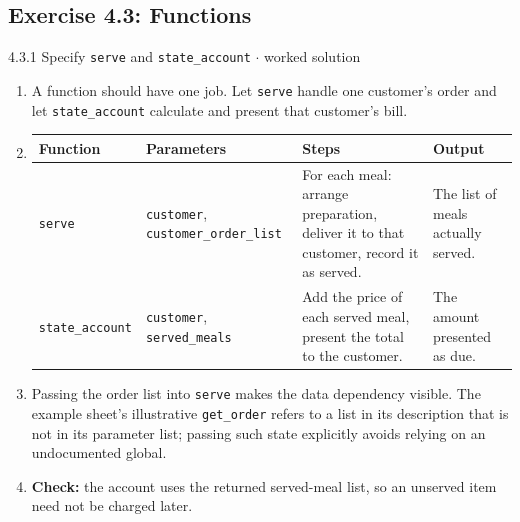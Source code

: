 \documentclass[11pt]{article}
\begin{document}
\begin{keepsection}\subsection{Exercise 4.3: Functions}

\begin{workedbox}{4.3.1 Specify \texttt{serve} and \texttt{state\_account} \ensuremath{\cdot} worked solution}
\begin{enumerate}
\item A function should have one job. Let \texttt{serve} handle one customer's order and let \texttt{state\_account} calculate and present that customer's bill.
\item {}
\begin{center}\small\begin{tabularx}{\linewidth}{>{\raggedright\arraybackslash}X>{\raggedright\arraybackslash}X>{\raggedright\arraybackslash}X>{\raggedright\arraybackslash}X}\toprule
\textbf{Function} & \textbf{Parameters} & \textbf{Steps} & \textbf{Output} \\ \midrule
\texttt{serve} & \texttt{customer}, \texttt{customer\_order\_list} & For each meal: arrange preparation, deliver it to that customer, record it as served. & The list of meals actually served. \\
\texttt{state\_account} & \texttt{customer}, \texttt{served\_meals} & Add the price of each served meal, present the total to the customer. & The amount presented as due. \\
\bottomrule\end{tabularx}\end{center}
\item Passing the order list into \texttt{serve} makes the data dependency visible. The example sheet's illustrative \texttt{get\_order} refers to a list in its description that is not in its parameter list; passing such state explicitly avoids relying on an undocumented global.
\item \textbf{Check:} the account uses the returned served-meal list, so an unserved item need not be charged later.
\end{enumerate}
\end{workedbox}

\end{keepsection}
\end{document}

